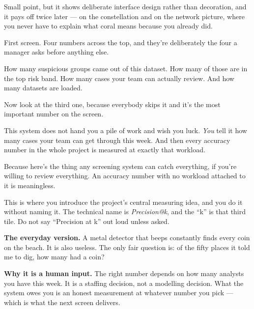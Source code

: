 \documentclass[11pt]{article}
\begin{document}
\begin{means}
Small point, but it shows deliberate interface design rather than decoration,
and it pays off twice later --- on the constellation and on the network
picture, where you never have to explain what coral means because you already
did.
\end{means}



\begin{saythis}
First screen. Four numbers across the top, and they're deliberately the four a
manager asks before anything else.

How many suspicious groups came out of this dataset. How many of those are in
the top risk band. How many cases your team can actually review. And how many
datasets are loaded.

Now look at the third one, because everybody skips it and it's the most
important number on the screen.

This system does not hand you a pile of work and wish you luck. \emph{You} tell
it how many cases your team can get through this week. And then every accuracy
number in the whole project is measured at exactly that workload.

Because here's the thing \bt any screening system can catch everything, if
you're willing to review everything. An accuracy number with no workload
attached to it is meaningless.
\end{saythis}

\begin{means}
This is where you introduce the project's central measuring idea, and you do it
without naming it. The technical name is \emph{Precision@k}, and the ``k'' is
that third tile. Do not say ``Precision at k'' out loud unless asked.

\textbf{The everyday version.} A metal detector that beeps constantly finds
every coin on the beach. It is also useless. The only fair question is: of the
fifty places it told me to dig, how many had a coin?

\textbf{Why it is a human input.} The right number depends on how many analysts
you have this week. It is a staffing decision, not a modelling decision. What
the system owes you is an honest measurement at whatever number you pick ---
which is what the next screen delivers.
\end{means}
\end{document}
